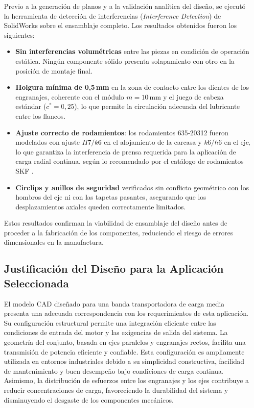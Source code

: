 \documentclass[conference]{IEEEtran}
\begin{document}
Previo a la generación de planos y a la validación analítica del diseño, se ejecutó la
herramienta de detección de interferencias (\textit{Interference Detection}) de SolidWorks
sobre el ensamblaje completo. Los resultados obtenidos fueron los siguientes:

\begin{itemize}
  \item \textbf{Sin interferencias volumétricas} entre las piezas en condición de operación
  estática. Ningún componente sólido presenta solapamiento con otro en la posición de
  montaje final.
  \item \textbf{Holgura mínima de 0{,}5\,mm} en la zona de contacto entre los dientes de
  los engranajes, coherente con el módulo $m = 10$\,mm y el juego de cabeza estándar
  ($c^* = 0{,}25$), lo que permite la circulación adecuada del lubricante entre los
  flancos.
  \item \textbf{Ajuste correcto de rodamientos}: los rodamientos 635-20312 fueron
  modelados con ajuste $H7/k6$ en el alojamiento de la carcasa y $k6/h6$ en el eje, lo
  que garantiza la interferencia de prensa requerida para la aplicación de carga radial
  continua, según lo recomendado por el catálogo de rodamientos SKF \cite{skf2018}.
  \item \textbf{Circlips y anillos de seguridad} verificados sin conflicto geométrico con
  los hombros del eje ni con las tapetas pasantes, asegurando que los desplazamientos
  axiales queden correctamente limitados.
\end{itemize}

Estos resultados confirman la viabilidad de ensamblaje del diseño antes de proceder a la
fabricación de los componentes, reduciendo el riesgo de errores dimensionales en la
manufactura.

\subsection{Justificación del Diseño para la Aplicación Seleccionada}

El modelo CAD diseñado para una banda transportadora de carga media presenta una
adecuada correspondencia con los requerimientos de esta aplicación. Su configuración
estructural permite una integración eficiente entre las condiciones de entrada del motor y
las exigencias de salida del sistema. La geometría del conjunto, basada en ejes paralelos y
engranajes rectos, facilita una transmisión de potencia eficiente y confiable. Esta
configuración es ampliamente utilizada en entornos industriales debido a su simplicidad
constructiva, facilidad de mantenimiento y buen desempeño bajo condiciones de carga
continua. Asimismo, la distribución de esfuerzos entre los engranajes y los ejes contribuye
a reducir concentraciones de carga, favoreciendo la durabilidad del sistema y disminuyendo
el desgaste de los componentes mecánicos.
\end{document}
